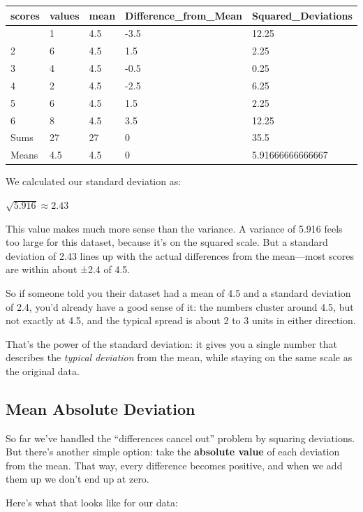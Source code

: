 \documentclass[
  letterpaper,
  DIV=11,
  numbers=noendperiod]{scrreprt}
\begin{document}
\begin{longtable}[]{@{}lllll@{}}
\toprule\noalign{}
scores & values & mean & Difference\_from\_Mean & Squared\_Deviations \\
\midrule\noalign{}
\endhead
\bottomrule\noalign{}
\endlastfoot
1 & 1 & 4.5 & -3.5 & 12.25 \\
2 & 6 & 4.5 & 1.5 & 2.25 \\
3 & 4 & 4.5 & -0.5 & 0.25 \\
4 & 2 & 4.5 & -2.5 & 6.25 \\
5 & 6 & 4.5 & 1.5 & 2.25 \\
6 & 8 & 4.5 & 3.5 & 12.25 \\
Sums & 27 & 27 & 0 & 35.5 \\
Means & 4.5 & 4.5 & 0 & 5.91666666666667 \\
\end{longtable}

We calculated our standard deviation as:

\(\sqrt{5.916} ≈2.43\)

This value makes much more sense than the variance. A variance of 5.916
feels too large for this dataset, because it's on the squared scale. But
a standard deviation of 2.43 lines up with the actual differences from
the mean---most scores are within about ±2.4 of 4.5.

So if someone told you their dataset had a mean of 4.5 and a standard
deviation of 2.4, you'd already have a good sense of it: the numbers
cluster around 4.5, but not exactly at 4.5, and the typical spread is
about 2 to 3 units in either direction.

That's the power of the standard deviation: it gives you a single number
that describes the \emph{typical deviation} from the mean, while staying
on the same scale as the original data.

\subsection{Mean Absolute Deviation}\label{mean-absolute-deviation}

So far we've handled the ``differences cancel out'' problem by squaring
deviations. But there's another simple option: take the \textbf{absolute
value} of each deviation from the mean. That way, every difference
becomes positive, and when we add them up we don't end up at zero.

Here's what that looks like for our data:
\end{document}
